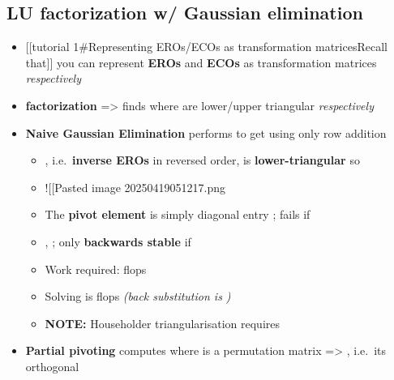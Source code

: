 \subsection*{LU factorization w/ Gaussian
elimination}

\begin{itemize}

\item
  {[}{[}tutorial 1\#Representing EROs/ECOs as transformation
  matrices\textbar Recall that{]}{]} you can represent \textbf{EROs} and
  \textbf{ECOs} as transformation matrices 
  \emph{respectively}
\item
  \textbf{ factorization} =\textgreater{} finds 
  where  are lower/upper triangular \emph{respectively}
\item
  \textbf{Naive Gaussian Elimination} performs
  \iMbox{\ds [I_{m} \ | \ A \ | \ I_{n}] \rightsquigarrow [R^{-1} \ | \ U \ | \ I_{n}]}
  to get  using only row addition

  \begin{itemize}
  
  \item
    , i.e.~\textbf{inverse EROs} in reversed order, is
    \textbf{lower-triangular} so 
  \item
    !{[}{[}Pasted image 20250419051217.png\textbar400{]}{]}
  \item
    The \textbf{pivot element} is simply diagonal entry
    ; fails if
  \item
    ,
    ;
    only \textbf{backwards stable} if
  \item
    Work required:  flops
  \item
    Solving  is  flops
    \emph{(back substitution is )}
  \item
    \textbf{NOTE:} Householder triangularisation requires
  \end{itemize}
\item
  \textbf{Partial pivoting} computes  where  is
  a permutation matrix =\textgreater{} , i.e.~its
  orthogonal


\end{itemize}
